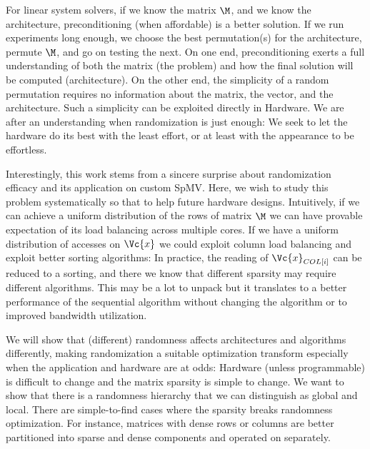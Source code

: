 \documentclass[acmsmall]{acmart}
\begin{document}
For linear system solvers, if we know the matrix $\M$, and we know the
architecture, preconditioning (when affordable) is a better solution.
If we run experiments long enough, we choose the best permutation(s)
for the architecture, permute $\M$, and go on testing the next.  On
one end, preconditioning exerts a full understanding of both the
matrix (the problem) and how the final solution will be computed
(architecture).  On the other end, the simplicity of a random
permutation requires no information about the matrix, the vector, and
the architecture. Such a simplicity can be exploited directly in
Hardware. We are after an understanding when randomization is just
enough: We seek to let the hardware do its best with the least effort,
or at least with the appearance to be effortless.


Interestingly, this work stems from a sincere surprise about
randomization efficacy and its application on custom SpMV. Here, we
wish to study this problem systematically so that to help future
hardware designs. Intuitively, if we can achieve a uniform
distribution of the rows of matrix $\M$ we can have provable
expectation of its load balancing across multiple cores. If we have a
uniform distribution of accesses on $\Vc{x}$ we could exploit column
load balancing and exploit better sorting algorithms: In practice, the
reading of $\Vc{x}_{COL[i]}$ can be reduced to a sorting, and there we know
that different sparsity  may require different algorithms. This may be 
a lot to unpack but it translates to a better performance of the
sequential algorithm without changing the algorithm or to improved bandwidth
utilization.


We will show that (different) randomness affects architectures and
algorithms differently, making randomization a suitable optimization
transform especially when the application and hardware are at odds:
Hardware (unless programmable) is difficult to change and the matrix
sparsity is simple to change. We want to show that there is a
randomness hierarchy that we can distinguish as global and
local. There are simple-to-find cases where the sparsity breaks
randomness optimization.  For instance, matrices with dense rows or
columns are better partitioned into sparse and dense components and
operated on separately.
{}
\end{document}
